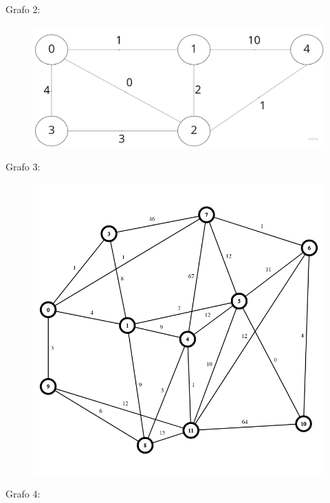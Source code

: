 \documentclass[12pt]{article}
\begin{document}
Grafo 2:


\begin{figure}[ht]
    \centering
    \includegraphics[scale=0.2]{grafo2.jpg}
\end{figure}

\newpage


Grafo 3:


\begin{figure}[ht]
    \centering
    \includegraphics[scale=0.6]{grafo3.png}
\end{figure}

\newpage

Grafo 4:
\end{document}
